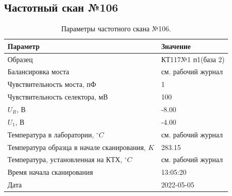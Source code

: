 \subsection{Частотный скан №106}
\begin{table}[!ht]
    \centering
    \caption{Параметры частотного скана №106.}
    \begin{tabular}{|l|l|}
        \hline
        Параметр                                       & Значение                  \\ \hline
        Образец                                        & КТ117№1 п1(база 2)        \\ \hline
        Балансировка моста                             & см. рабочий журнал        \\ \hline
        Чувствительность моста, пФ                     & 1                         \\ \hline
        Чувствительность селектора, мВ                 & 100                       \\ \hline
        $U_R$, В                                       & -8.00                     \\ \hline
        $U_1$, В                                       & -4.00                     \\ \hline
        Температура в лаборатории, $^\circ C$          & см. рабочий журнал        \\ \hline
        Температура образца в начале сканирования, $K$ & 283.15                    \\ \hline
        Температура, установленная на КТХ, $^\circ C$  & см. рабочий журнал        \\ \hline
        Время начала сканирования                      & 13:05:20                  \\ \hline
        Дата                                           & 2022-05-05                \\ \hline
    \end{tabular}
    \label{table:frequency_scan_106}
\end{table}

